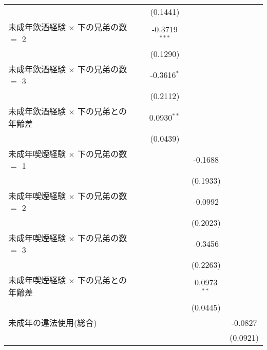 \documentclass{article}
\begin{document}
\begin{landscape}
\begin{threeparttable}[b]
\begin{tabular}{lcccc}
                                                          &               & (0.1441)        &               &   \\   
      未成年飲酒経験 $\times$ 下の兄弟の数 $=$ 2          &               & -0.3719$^{***}$ &               &   \\   
                                                          &               & (0.1290)        &               &   \\   
      未成年飲酒経験 $\times$ 下の兄弟の数 $=$ 3          &               & -0.3616$^{*}$   &               &   \\   
                                                          &               & (0.2112)        &               &   \\   
      未成年飲酒経験 $\times$ 下の兄弟との年齢差          &               & 0.0930$^{**}$   &               &   \\   
                                                          &               & (0.0439)        &               &   \\   
      未成年喫煙経験 $\times$ 下の兄弟の数 $=$ 1          &               &                 & -0.1688       &   \\   
                                                          &               &                 & (0.1933)      &   \\   
      未成年喫煙経験 $\times$ 下の兄弟の数 $=$ 2          &               &                 & -0.0992       &   \\   
                                                          &               &                 & (0.2023)      &   \\   
      未成年喫煙経験 $\times$ 下の兄弟の数 $=$ 3          &               &                 & -0.3456       &   \\   
                                                          &               &                 & (0.2263)      &   \\   
      未成年喫煙経験 $\times$ 下の兄弟との年齢差          &               &                 & 0.0973$^{**}$ &   \\   
                                                          &               &                 & (0.0445)      &   \\   
      未成年の違法使用(総合)                              &               &                 &               & -0.0827\\   
                                                          &               &                 &               & (0.0921)\\   

\end{tabular}
\end{threeparttable}
\end{landscape}
\end{document}
